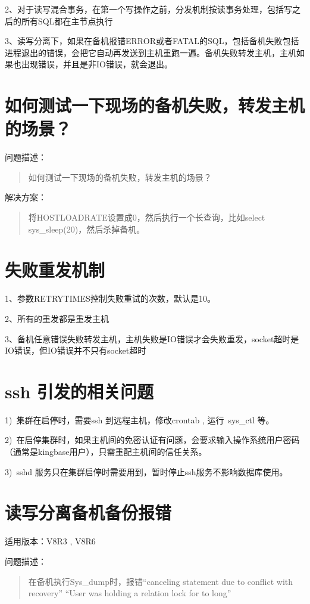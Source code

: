 \documentclass[letterpaper,10pt,english]{sphinxmanual}
\begin{document}
2、对于读写混合事务，在第一个写操作之前，分发机制按读事务处理，包括写之后的所有SQL都在主节点执行

3、读写分离下，如果在备机报错ERROR或者FATAL的SQL，包括备机失败包括进程退出的错误，会把它自动再发送到主机重跑一遍。备机失败转发主机，主机如果也出现错误，并且是非IO错误，就会退出。


\section{如何测试一下现场的备机失败，转发主机的场景？}
\label{\detokenize{high-availability:id3}}
问题描述：
\begin{quote}

如何测试一下现场的备机失败，转发主机的场景？
\end{quote}

解决方案：
\begin{quote}

将HOSTLOADRATE设置成0，然后执行一个长查询，比如select sys\_sleep(20)，然后杀掉备机。
\end{quote}


\section{失败重发机制}
\label{\detokenize{high-availability:id4}}
1、参数RETRYTIMES控制失败重试的次数，默认是10。

2、所有的重发都是重发主机

3、备机任意错误失败转发主机，主机失败是IO错误才会失败重发，socket超时是IO错误，但IO错误并不只有socket超时


\section{ssh 引发的相关问题}
\label{\detokenize{high-availability:ssh}}
1) 集群在启停时，需要ssh 到远程主机，修改crontab , 运行 sys\_ctl 等。

2) 在启停集群时，如果主机间的免密认证有问题，会要求输入操作系统用户密码（通常是kingbase用户），只需重配主机间的信任关系。

3) sshd 服务只在集群启停时需要用到，暂时停止ssh服务不影响数据库使用。


\section{读写分离备机备份报错}
\label{\detokenize{high-availability:id5}}
适用版本：V8R3 , V8R6

问题描述：
\begin{quote}

在备机执行Sys\_dump时，报错“canceling statement due to conflict with recovery” “User was holding a relation lock for to long”
\end{quote}
\end{document}
